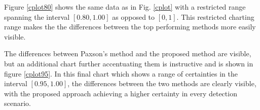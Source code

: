 \documentclass{llncs}
\begin{document}


Figure \ref{cplot80} shows the same data as in Fig. \ref{cplot} with a
restricted range spanning the interval $[0.80,1.00]$ as opposed to $[0,1]$. This
restricted charting range makes the the differences between the top performing
methods more easily visible.




The differences between Paxson's method and the proposed method are visible, but
an additional chart further accentuating them is instructive and is shown in
figure \ref{cplot95}. In this final chart which shows a range of certainties in
the interval $[0.95,1.00]$, the differences between the two methods are clearly
visible, with the proposed approach achieving a higher certainty in every
detection scenario.
\end{document}
